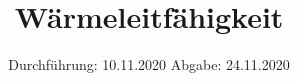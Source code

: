 

\subject{V204}
\title{Wärmeleitfähigkeit}
\date{%
  Durchführung: 10.11.2020
  \hspace{3em}
  Abgabe: 24.11.2020
}



\maketitle
\thispagestyle{empty}
\tableofcontents
\newpage





\nocite{*}
\printbibliography{}



